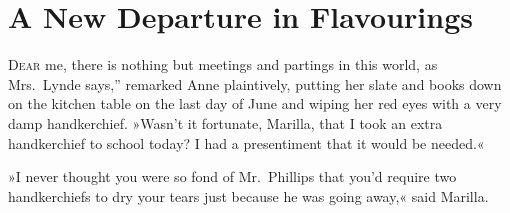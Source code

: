 \chapter{A New Departure in Flavourings}

\lettrine[ante=“,lines=4]{D}{ear} me, there is nothing but meetings and partings in this world, as Mrs.~Lynde says,” remarked Anne plaintively, putting her slate and books down on the kitchen table on the last day of June and wiping her red eyes with a very damp handkerchief. »Wasn't it fortunate, Marilla, that I took an extra handkerchief to school today? I had a presentiment that it would be needed.«

»I never thought you were so fond of Mr.~Phillips that you'd require two handkerchiefs to dry your tears just because he was going away,« said Marilla.

